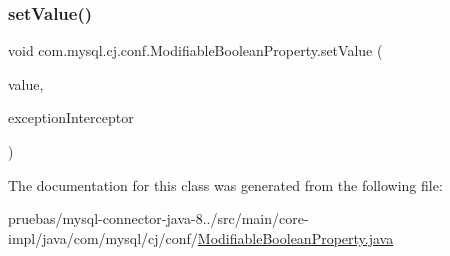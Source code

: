 \subsubsection{\texorpdfstring{set\+Value()}{setValue()}\hspace{0.1cm}{\footnotesize\ttfamily [2/2]}}
{\footnotesize\ttfamily void com.\+mysql.\+cj.\+conf.\+Modifiable\+Boolean\+Property.\+set\+Value (\begin{DoxyParamCaption}\item[{Boolean}]{value,  }\item[{\mbox{\hyperlink{interfacecom_1_1mysql_1_1cj_1_1exceptions_1_1_exception_interceptor}{Exception\+Interceptor}}}]{exception\+Interceptor }\end{DoxyParamCaption})}



The documentation for this class was generated from the following file\+:\begin{DoxyCompactItemize}
\item 
pruebas/mysql-\/connector-\/java-\/8../src/main/core-\/impl/java/com/mysql/cj/conf/\mbox{\hyperlink{_modifiable_boolean_property_8java}{Modifiable\+Boolean\+Property.\+java}}\end{DoxyCompactItemize}
